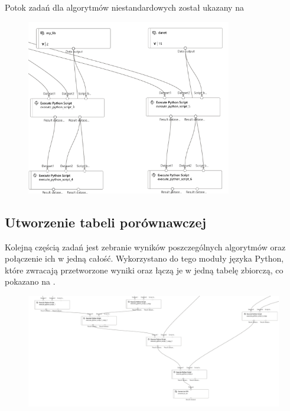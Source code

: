 Potok zadań dla algorytmów niestandardowych został ukazany na 

\begin{figure}[H]
    \centering
    \includegraphics[width=0.8\textwidth]{images/au-pipe}
    \label{fig:au-pipe}
\end{figure}

\subsection{Utworzenie tabeli porównawczej}
Kolejną częścią zadań jest zebranie wyników poszczególnych algorytmów oraz połączenie ich w jedną całość. Wykorzystano do tego moduły języka Python, które zwracają przetworzone wyniki oraz łączą je w jedną tabelę zbiorczą, co pokazano na .

\begin{figure}[H]
    \centering
    \includegraphics[width=\textwidth]{images/pipe-csv}
    \label{fig:pipe-4}
\end{figure}


